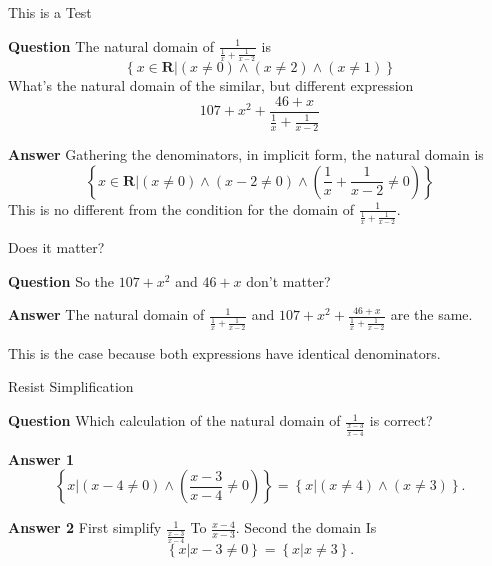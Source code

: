 \documentclass[usenames,dvipsnames,fleqn,leqno,10pt, pdflatex]{beamer}
\newcommand{\reals}{\mathbf{R}}
\begin{document}
\begin{frame}{This is a Test}

\textbf{Question} The natural domain of 
\(\frac{1}{\frac{1}{x} + \frac{1}{x-2}} \) is 
\begin{equation*}
    \left\{ x \in \reals \bigg | \left(x \neq 0\right)  
    \land \left(x  \neq 2 \right) \land  
    \left(x \neq 1 \right) \right\}
\end{equation*}
What's the natural domain of the similar, but different expression   
\begin{equation*}
    107 + x^2 + \frac{46 + x}{\frac{1}{x} + \frac{1}{x-2}} 
\end{equation*}  

\textbf{Answer} Gathering the denominators, in implicit form, the
natural domain is
\begin{equation*}
    \left\{ x \in \reals \bigg | \left(x \neq 0 \right)  
    \land \left(x-2 \neq 0 \right) \land  
    \left(\frac{1}{x} + \frac{1}{x-2} \neq 0 \right) \right\}
\end{equation*}
This is no different from the condition for the domain of 
\(\frac{1}{\frac{1}{x} + \frac{1}{x-2}}\).

\end{frame}

\begin{frame}{Does it matter?}

\textbf{Question} So the \(107 + x^2\) and \(46 + x\) don't matter?

\textbf{Answer} The natural domain of \(\frac{1}{\frac{1}{x} + \frac{1}{x-2}} \)
and \( 107 + x^2 + \frac{46 + x}{\frac{1}{x} + \frac{1}{x-2}}  \) are
the same. 

This is the case because both expressions have identical denominators.

\vfill

\end{frame}

\begin{frame}{Resist Simplification}

\textbf{Question} Which calculation of the natural domain
of  \(\frac{1}{\frac{x-3}{x-4}} \) is correct?

\textbf{Answer 1}
\[
  \left  \{ x \big | \left(x-4 \neq 0\right) \land  
      \left(\frac{x-3}{x-4} \neq 0 \right) \right \} =
      \left \{ x \big | \left(x \neq 4 \right) \land  
      \left(x \neq 3 \right) \right \}.
\]

\textbf{Answer 2} First simplify \(\frac{1}{\frac{x-3}{x-4}} \) To
\(\frac{x-4}{x-3} \). Second the domain Is
\[
    \left \{ x \big | x-3 \neq 0  \right \} =
       \left \{ x \big | x \neq 3  \right \}.
 \]

\end{frame}
\end{document}
